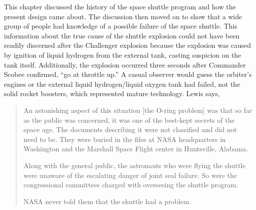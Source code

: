 This chapter discussed the history of the space shuttle
program and how the present design came about.
The discussion then moved on to show that a wide group of
people had knowledge of a possible failure of the space
shuttle.
This information about the true cause of the shuttle
explosion could not have been readily discerned after
the Challenger explosion because the explosion was caused by
ignition of liquid hydrogen from the external tank, casting
suspicion on the tank itself.
Additionally, the explosion occurred three seconds after
Commander Scobee confirmed, ``go at throttle up.'' A casual
observer would guess the orbiter's engines 
or the external liquid hydrogen/liquid oxygen tank had
failed, not the
solid rocket boosters, which represented mature technology.
Lewis says,
\begin{singlespace}
\begin{quotation}
\noindent
An astonishing aspect of this situation [the O-ring problem]
was that so far as the public was concerned, it was one of
the best-kept secrets of the space age.
The documents describing it were not classified and did not
need to be.
They were buried in the files at NASA headquarters in
Washington and the Marshall Space Flight center in
Huntsville, Alabama.\par
\bigskip
\noindent
Along with the general public, the astronauts who were
flying the shuttle were unaware of the escalating danger of
joint seal failure.  So were the congressional committees
charged with overseeing the shuttle program.\par
\bigskip
\noindent
NASA never told them that the shuttle had a problem.
\end{quotation}
\end{singlespace}

